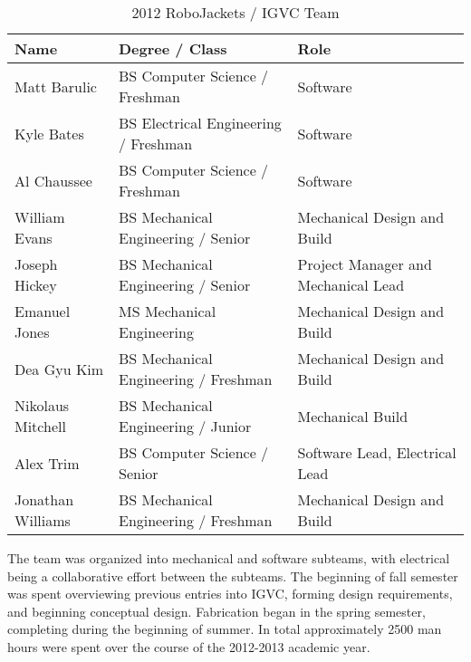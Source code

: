 \begin{table}[H]
\begin{center}
\caption{2012 RoboJackets / IGVC Team}
\begin{tabular}{| l | p{2.4in} | p{2in} |}
\hline
Name & Degree / Class & Role\\ \hline
Matt Barulic &		BS Computer Science / Freshman& Software\\ \hline
Kyle Bates & 		BS Electrical Engineering / Freshman& Software\\ \hline
Al Chaussee &		BS Computer Science / Freshman& Software\\ \hline
William Evans &		BS Mechanical Engineering / Senior& Mechanical Design and Build\\ \hline
Joseph Hickey &		BS Mechanical Engineering / Senior& Project Manager and	Mechanical Lead\\ \hline
Emanuel Jones &		MS Mechanical Engineering& Mechanical Design and Build\\ \hline
Dea Gyu Kim &	BS Mechanical Engineering / Freshman & Mechanical Design and Build\\ \hline
Nikolaus Mitchell &		BS Mechanical Engineering / Junior& Mechanical Build\\ \hline
Alex Trim &	BS Computer Science / Senior&	Software Lead, Electrical Lead\\ \hline
Jonathan Williams &	BS Mechanical Engineering / Freshman & Mechanical Design and Build\\ \hline


\end{tabular}
\label{TAB:RJTeam}
\end{center}
\end{table}

The team was organized into mechanical and software subteams, with electrical being a collaborative effort between the subteams. The beginning of fall semester was spent overviewing previous entries into IGVC, forming design requirements, and beginning conceptual design. Fabrication began in the spring semester, completing during the beginning of summer. In total approximately 2500 man hours were spent over the course of the 2012-2013 academic year.
